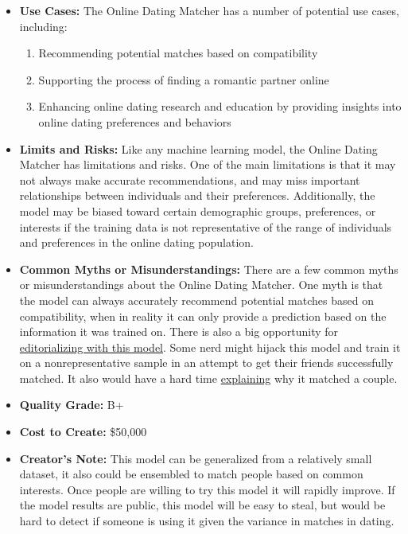 \begin{itemize}
    \item \textbf{Use Cases:} The Online Dating Matcher has a number of potential use cases, including:
        \begin{enumerate}  
            \item Recommending potential matches based on compatibility
            \item Supporting the process of finding a romantic partner online
            \item Enhancing online dating research and education by providing insights into online dating preferences and behaviors
        \end{enumerate}
    \item \textbf{Limits and Risks:} Like any machine learning model, the Online Dating Matcher has limitations and risks. One of the main limitations is that it may not always make accurate recommendations, and may miss important relationships between individuals and their preferences. Additionally, the model may be biased toward certain demographic groups, preferences, or interests if the training data is not representative of the range of individuals and preferences in the online dating population.
    \item \textbf{Common Myths or Misunderstandings:} There are a few common myths or misunderstandings about the Online Dating Matcher. One myth is that the model can always accurately recommend potential matches based on compatibility, when in reality it can only provide a prediction based on the information it was trained on. There is also a big opportunity for \hyperref[sec:janitor]{editorializing with this model}. Some nerd might hijack this model and train it on a nonrepresentative sample in an attempt to get their friends successfully matched. It also would have a hard time \hyperref[sec:explain]{explaining} why it matched a couple.
    \item \textbf{Quality Grade:} B+
    \item \textbf{Cost to Create:} \$50,000
    \item \textbf{Creator's Note:} This model can be generalized from a relatively small dataset, it also could be ensembled to match people based on common interests. Once people are willing to try this model it will rapidly improve. If the model results are public, this model will be easy to steal, but would be hard to detect if someone is using it given the variance in matches in dating.
\end{itemize}

